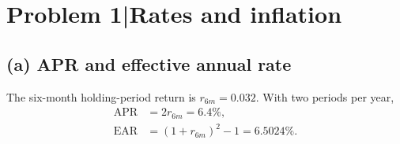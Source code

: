 \documentclass[11pt,a4paper]{article}
\newcommand{\StudentName}{}
\newcommand{\StudentID}{}
\newcommand{\SubmissionDate}{}
\newcommand{\problem}[2]{\section*{Problem #1\enspace|\enspace #2}}
\newcommand{\heading}[1]{\subsection*{#1}}
\begin{document}
\problem{1}{Rates and inflation}
\heading{(a) APR and effective annual rate}
The six-month holding-period return is $r_{6m}=0.032$. With two periods per year,
\begin{align*}
\mathrm{APR}&=2r_{6m}=\boxed{6.4\%},\\
\mathrm{EAR}&=(1+r_{6m})^2-1=\boxed{6.5024\%}.
\end{align*}
\end{document}
